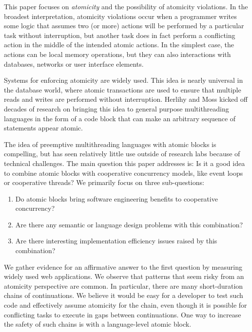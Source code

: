 \documentclass[acmsmall,anonymous,review]{acmart}\settopmatter{printfolios=true,printccs=false,printacmref=false}
\begin{document}

This paper focuses on \emph{atomicity} and the possibility of atomicity violations.
In the broadest interpretation, atomicity violations occur when a programmer writes some logic that assumes two (or more) actions will be performed by a particular task without interruption, but another task does in fact perform a conflicting action in the middle of the intended atomic actions.
In the simplest case, the actions can be local memory operations, but they can also interactions with databases, networks or user interface elements.

Systems for enforcing atomicity are widely used.
This idea is nearly universal in the database world, where atomic transactions are used to ensure that multiple reads and writes are performed without interruption.
Herlihy and Moss \cite{Herlihy1993} kicked off decades of research on bringing this idea to general purpose multithreading languages in the form of a code block that can make an arbitrary sequence of statements appear atomic.


The idea of preemptive multithreading languages with atomic blocks is compelling, but has seen relatively little use outside of research labs because of technical challenges.
The main question this paper addresses is: Is it a good idea to combine atomic blocks with cooperative concurrency models, like event loops or cooperative threads?
We primarily focus on three sub-questions:
\begin{enumerate}
\item Do atomic blocks bring software engineering benefits to cooperative concurrency?
\item Are there any semantic or language design problems with this combination?
\item Are there interesting implementation efficiency issues raised by this combination?
\end{enumerate}

We gather evidence for an affirmative answer to the first question by measuring widely used web applications\footnotemark{}.
We observe that patterns that seem risky from an atomicity perspective are common.
In particular, there are many short-duration chains of continuations.
We believe it would be easy for a developer to test such code and effectively assume atomicity for the chain, even though it is possible for conflicting tasks to execute in gaps between continuations.
One way to increase the safety of such chains is with a language-level atomic block.
\end{document}
